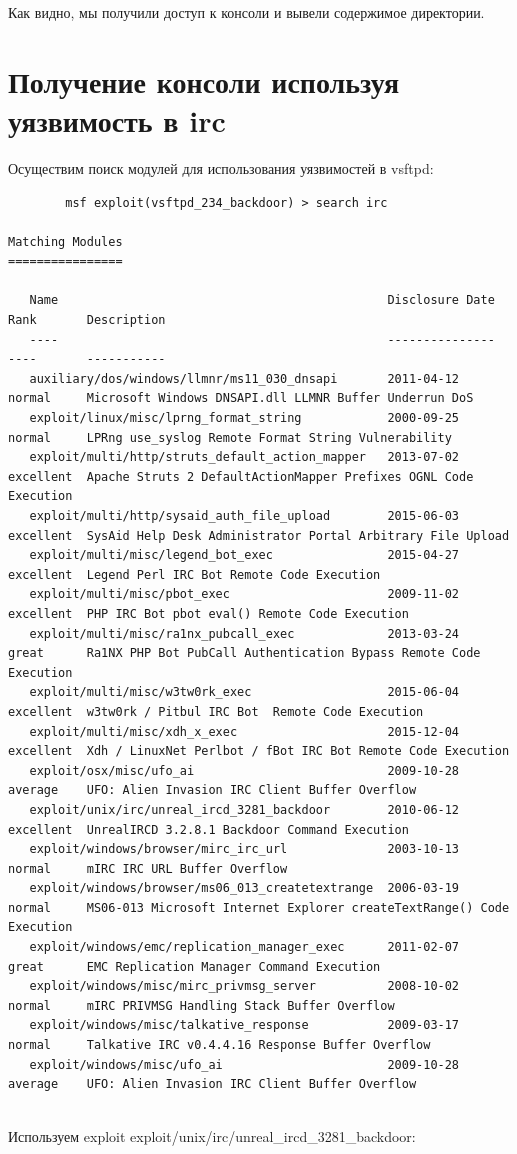 \documentclass[10pt,a4paper]{report}
\begin{document}
		Как видно, мы получили доступ к консоли и вывели содержимое директории.		
		
	\section{Получение консоли используя уязвимость в irc}

		Осуществим поиск модулей для использования уязвимостей в vsftpd:
		\begin{lstlisting}	
		msf exploit(vsftpd_234_backdoor) > search irc

Matching Modules
================

   Name                                              Disclosure Date  Rank       Description
   ----                                              ---------------  ----       -----------
   auxiliary/dos/windows/llmnr/ms11_030_dnsapi       2011-04-12       normal     Microsoft Windows DNSAPI.dll LLMNR Buffer Underrun DoS
   exploit/linux/misc/lprng_format_string            2000-09-25       normal     LPRng use_syslog Remote Format String Vulnerability
   exploit/multi/http/struts_default_action_mapper   2013-07-02       excellent  Apache Struts 2 DefaultActionMapper Prefixes OGNL Code Execution
   exploit/multi/http/sysaid_auth_file_upload        2015-06-03       excellent  SysAid Help Desk Administrator Portal Arbitrary File Upload
   exploit/multi/misc/legend_bot_exec                2015-04-27       excellent  Legend Perl IRC Bot Remote Code Execution
   exploit/multi/misc/pbot_exec                      2009-11-02       excellent  PHP IRC Bot pbot eval() Remote Code Execution
   exploit/multi/misc/ra1nx_pubcall_exec             2013-03-24       great      Ra1NX PHP Bot PubCall Authentication Bypass Remote Code Execution
   exploit/multi/misc/w3tw0rk_exec                   2015-06-04       excellent  w3tw0rk / Pitbul IRC Bot  Remote Code Execution
   exploit/multi/misc/xdh_x_exec                     2015-12-04       excellent  Xdh / LinuxNet Perlbot / fBot IRC Bot Remote Code Execution
   exploit/osx/misc/ufo_ai                           2009-10-28       average    UFO: Alien Invasion IRC Client Buffer Overflow
   exploit/unix/irc/unreal_ircd_3281_backdoor        2010-06-12       excellent  UnrealIRCD 3.2.8.1 Backdoor Command Execution
   exploit/windows/browser/mirc_irc_url              2003-10-13       normal     mIRC IRC URL Buffer Overflow
   exploit/windows/browser/ms06_013_createtextrange  2006-03-19       normal     MS06-013 Microsoft Internet Explorer createTextRange() Code Execution
   exploit/windows/emc/replication_manager_exec      2011-02-07       great      EMC Replication Manager Command Execution
   exploit/windows/misc/mirc_privmsg_server          2008-10-02       normal     mIRC PRIVMSG Handling Stack Buffer Overflow
   exploit/windows/misc/talkative_response           2009-03-17       normal     Talkative IRC v0.4.4.16 Response Buffer Overflow
   exploit/windows/misc/ufo_ai                       2009-10-28       average    UFO: Alien Invasion IRC Client Buffer Overflow


		\end{lstlisting}		
		Используем exploit exploit/unix/irc/unreal\_ircd\_3281\_backdoor:
		
\end{document}
